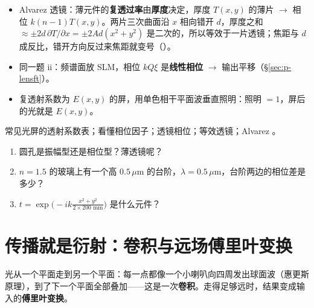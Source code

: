 \pkao
\begin{itemize}
\item Alvarez 透镜：薄元件的\textbf{复透过率}由\textbf{厚度}决定，厚度 $T(x,y)$ 的薄片 $\to$ 相位 $k(n-1)T(x,y)$。两片三次曲面沿 $x$ 相向错开 $d$，厚度之和 $\approx\pm2d\,\partial T/\partial x=\pm2Ad(x^2+y^2)$ 是二次的，所以等效于一片透镜；焦距与 $d$ 成反比，错开方向反过来焦距就变号（\pageref{sec:alvarezi}）。
\item 同一题 ii：频谱面放 SLM，相位 $kQ\xi$ 是\textbf{线性相位} $\to$ 输出平移（§\ref{sec:p-lensft}）。
\item 复透射系数为 $E(x,y)$ 的屏，用单色相干平面波垂直照明：照明 $=1$，屏后的光就是 $E(x,y)$。
\end{itemize}

\psee 常见光屏的透射系数表\pageref{sec:screens}；看懂相位因子\pageref{sec:phasefactors}；透镜相位\pageref{sec:lensphase}；等效透镜\pageref{sec:equivlens}；Alvarez \pageref{sec:alvarez}。

\begin{enumerate}[label=\arabic*.]
\item 圆孔是振幅型还是相位型？薄透镜呢？
\item $n=1.5$ 的玻璃上有一个高 $0.5\,\mu$m 的台阶，$\lambda=0.5\,\mu$m，台阶两边的相位差是多少？
\item $t=\exp\!\big(-ik\frac{x^2+y^2}{2\times200\text{ mm}}\big)$ 是什么元件？
\end{enumerate}

\section{传播就是衍射：卷积与远场傅里叶变换}\label{sec:p-diff}

\begin{idea}[一句话]
光从一个平面走到另一个平面：每一点都像一个小喇叭向四周发出球面波（惠更斯原理），到了下一个平面全部叠加——这是一次\textbf{卷积}。走得足够远时，结果变成输入的\textbf{傅里叶变换}。
\end{idea}

